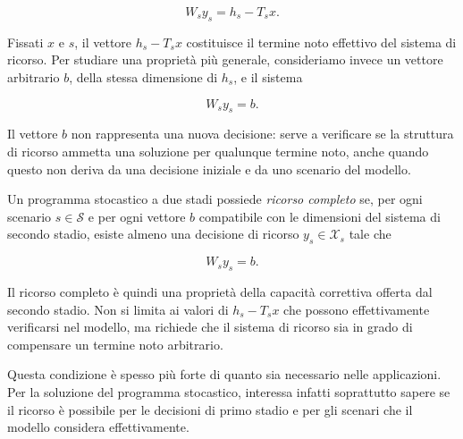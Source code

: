 \[
W_sy_s=h_s-T_sx.
\]

Fissati $x$ e $s$, il vettore $h_s-T_sx$ costituisce
il termine noto effettivo del sistema di ricorso.
Per studiare una propriet\`{a} pi\`{u} generale,
consideriamo invece un vettore arbitrario $b$,
della stessa dimensione di $h_s$, e il sistema

\[
W_sy_s=b.
\]

Il vettore $b$ non rappresenta una nuova decisione:
serve a verificare se la struttura di ricorso
ammetta una soluzione per qualunque termine noto,
anche quando questo non deriva da una decisione
iniziale e da uno scenario del modello.










\begin{definition}

Un programma stocastico a due stadi possiede \emph{ricorso completo} se, per ogni
scenario $s\in\mathcal S$ e per ogni vettore $b$
compatibile con le dimensioni del sistema di secondo
stadio, esiste almeno una decisione di ricorso
$y_s\in\mathcal X_s$ tale che

\[
W_sy_s=b.
\]

\end{definition}



Il ricorso completo \`e quindi una propriet\`a della capacit\`a correttiva
offerta dal secondo stadio. Non si limita ai valori di $h_s-T_sx$ che possono
effettivamente verificarsi nel modello, ma richiede che il sistema di ricorso
sia in grado di compensare un termine noto arbitrario.

Questa condizione \`e spesso pi\`u forte di quanto sia necessario nelle
applicazioni. Per la soluzione del programma stocastico, interessa infatti
soprattutto sapere se il ricorso \`e possibile per le decisioni di primo
stadio e per gli scenari che il modello considera effettivamente.


